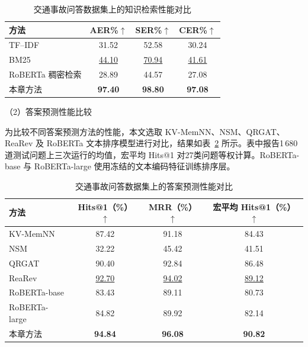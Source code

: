 \begin{table}[htbp]
  \centering
  \caption{交通事故问答数据集上的知识检索性能对比}
  \label{tab:ch2-retrieval}
  \fontsize{10.5bp}{13.65bp}\selectfont
  \begin{tabular*}{\linewidth}{@{\extracolsep{\fill}}lccc@{}}
    \toprule
    方法 & AER\%$\uparrow$ & SER\%$\uparrow$ & CER\%$\uparrow$ \\
    \midrule
    TF--IDF & 31.52 & 52.58 & 30.24 \\
    BM25 & \underline{44.10} & \underline{70.94} & \underline{41.61} \\
    RoBERTa 稠密检索 & 28.89 & 44.57 & 27.08 \\
    \midrule
    本章方法 & \textbf{97.40} & \textbf{98.80} & \textbf{97.08} \\
    \bottomrule
  \end{tabular*}
\end{table}

\noindent（2）答案预测性能比较

为比较不同答案预测方法的性能，本文选取 KV-MemNN、NSM、QRGAT、ReaRev 及 RoBERTa 文本排序模型进行对比，结果如表~\ref{tab:ch2-main} 所示。表中报告1\,680道测试问题上三次运行的均值，宏平均 Hits@1 对27类问题等权计算。RoBERTa-base 与 RoBERTa-large 使用冻结的文本编码特征训练排序层。

\begin{table}[htbp]
  \centering
  \caption{交通事故问答数据集上的答案预测性能对比}
  \label{tab:ch2-main}
  \fontsize{10.5bp}{13.65bp}\selectfont
  \begin{tabular*}{\linewidth}{@{\extracolsep{\fill}}lccc@{}}
    \toprule
    方法 & Hits@1（\%）$\uparrow$ & MRR（\%）$\uparrow$ & 宏平均 Hits@1（\%）$\uparrow$ \\
    \midrule
    KV-MemNN & 87.42 & 91.18 & 84.43 \\
    NSM & 32.22 & 45.42 & 41.51 \\
    QRGAT & 90.40 & 92.84 & 86.48 \\
    ReaRev & \underline{92.70} & \underline{94.02} & \underline{89.12} \\
    RoBERTa-base & 83.43 & 89.11 & 80.73 \\
    RoBERTa-large & 84.82 & 89.92 & 82.14 \\
    \midrule
    本章方法 & \textbf{94.84} & \textbf{96.08} & \textbf{90.82} \\
    \bottomrule
  \end{tabular*}
\end{table}

